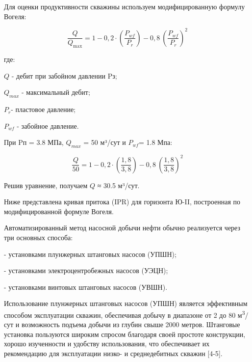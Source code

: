 \begin{multicols}{2}
Для оценки продуктивности скважины используем модифицированную формулу
Вогеля:

\begin{equation}
\frac{Q}{Q_{\max}} = 1 - 0,2 \cdot \left( \frac{P_{wf}}{P_{r}} \right) - 0,8\ \left( \frac{P_{wf}}{P_{r}} \right)^{2}
\end{equation}

где:

$Q$ - дебит при забойном давлении Pз;

$Q_{max}$ - максимальный дебит;

$P_r$​ - пластовое давление;

$P_{wf}$ - забойное давление.

При Pп = 3.8 МПа, $Q_{max}$ = 50 м³/сут и $P_{wf}$ ​= 1.8 Мпа:

\[\frac{Q}{50} = 1 - 0,2 \cdot \left( \frac{1,8}{3,8} \right) - 0,8\ \left( \frac{1,8}{3,8} \right)^{2}\]

Решив уравнение, получаем $Q$ ≈ 30.5 м³/сут.

Ниже представлена кривая притока (IPR) для горизонта Ю-II, построенная
по модифицированной формуле Вогеля.

Автоматизированный метод насосной добычи нефти обычно реализуется через
три основных способа:

- установками плунжерных штанговых насосов (УПШН);

- установками электроцентробежных насосов (УЭЦН);

- установками винтовых штанговых насосов (УВШН).

Использование плунжерных штанговых насосов (УПШН) является эффективным
способом эксплуатации скважин, обеспечивая добычу в диапазоне от 2 до 80
м\textsuperscript{3}/сут и возможность подъема добычи из глубин свыше
2000 метров. Штанговые установка пользуются широким спросом благодаря
своей простоте конструкции, хорошо изученности и удобству использования,
что обеспечивает их рекомендацию для эксплуатации низко- и
среднедебитных скважин {[}4-5{]}.
\end{multicols}

